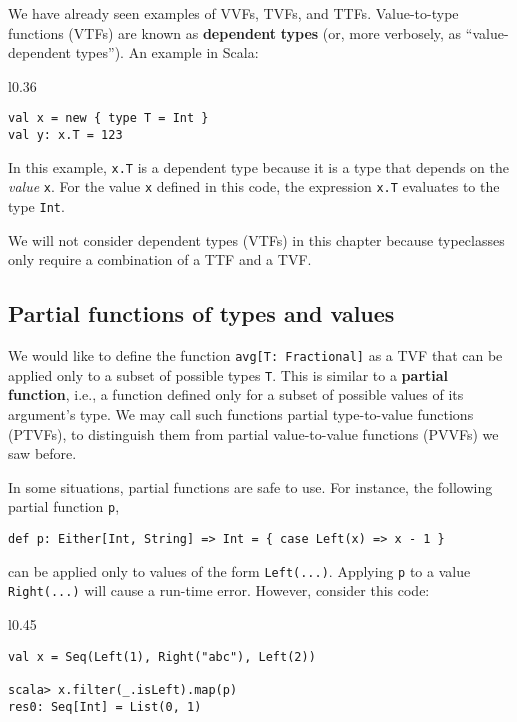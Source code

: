 We have already seen examples of VVFs, TVFs, and TTFs. Value-to-type
functions (VTFs) are known as \textbf{dependent} \textbf{types}
(or, more verbosely, as \textsf{``}value-dependent types\textsf{''}). An example in
Scala:

\begin{wrapfigure}{l}{0.36\columnwidth}%
\vspace{-0.75\baselineskip}
\begin{lstlisting}
val x = new { type T = Int }
val y: x.T = 123
\end{lstlisting}

\vspace{-0.75\baselineskip}
\end{wrapfigure}%

\noindent In this example, \lstinline!x.T! is a dependent type because
it is a type that depends on the \emph{value} \lstinline!x!. For
the value \lstinline!x! defined in this code, the expression \lstinline!x.T!
evaluates to the type \lstinline!Int!. 

We will not consider dependent types (VTFs) in this chapter because
typeclasses only require a combination of a TTF and a TVF.

\subsection{Partial functions of types and values}

We would like to define the function \lstinline!avg[T: Fractional]!
as a TVF that can be applied only to a subset of possible types \lstinline!T!.
This is similar to a \textbf{partial function},
i.e., a function defined only for a subset of possible values of its
argument\textsf{'}s type. We may call such functions partial type-to-value
functions (PTVFs), to distinguish
them from partial value-to-value functions (PVVFs) we saw before.

In some situations, partial functions are safe to use. For instance,
the following partial function \lstinline!p!, 
\begin{lstlisting}
def p: Either[Int, String] => Int = { case Left(x) => x - 1 }
\end{lstlisting}
can be applied only to values of the form \lstinline!Left(...)!.
Applying \lstinline!p! to a value \lstinline!Right(...)! will cause
a run-time error. However, consider this code:

\begin{wrapfigure}{l}{0.45\columnwidth}%
\vspace{-1\baselineskip}
\begin{lstlisting}
val x = Seq(Left(1), Right("abc"), Left(2))

scala> x.filter(_.isLeft).map(p)
res0: Seq[Int] = List(0, 1)
\end{lstlisting}

\vspace{-1\baselineskip}
\end{wrapfigure}%

